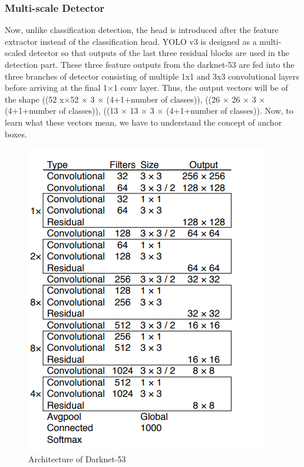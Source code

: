 \subsubsection*{Multi-scale Detector}
  Now, unlike classification detection, the head is introduced after the feature extractor instead of the classification head. YOLO v3 is designed as a multi-scaled detector so that outputs of the last three residual blocks are used in the detection part. These three feature outputs from the darknet-53 are fed into the three branches of detector consisting of multiple 1x1 and 3x3 convolutional layers before arriving at the final 1$\times$1 conv layer. Thus, the output vectors will be of the shape ((52 x$\times$52 $\times$ 3 $\times$ (4+1+number of classes)),  ((26 $\times$ 26 $\times$ 3 $\times$ (4+1+number of classes)), ((13 $\times$ 13 $\times$ 3 $\times$ (4+1+number of classes)). Now, to learn what these vectors mean, we have to understand the concept of anchor boxes.
  \begin{figure}[H]
    \centering
    \captionsetup{justification = centering}
    \includegraphics[scale= 1]{CHAPTERS/Chapter-5/images/5.3.PNG}
    \caption{Architecture of Darknet-53} 
    \label{fig:5.3}
  \end{figure}
